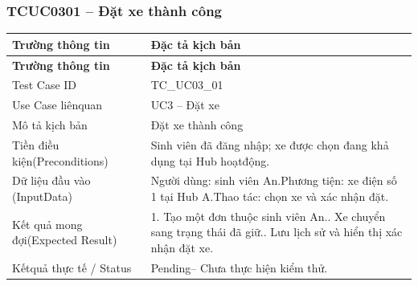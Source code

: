 \subsubsection{TCUC0301 – Đặt xe thành công}
\begin{longtable}{|L{0.24\textwidth}|L{0.70\textwidth}|}
\hline
\textbf{Trường thông tin} & \textbf{Đặc tả kịch bản} \\
\hline
\endfirsthead
\hline
\textbf{Trường thông tin} & \textbf{Đặc tả kịch bản} \\
\hline
\endhead
Test Case ID & TC\_UC03\_01 \\
\hline
Use Case liênquan & UC3 – Đặt xe \\
\hline
Mô tả kịch bản & Đặt xe thành công \\
\hline
Tiền điều kiện\newline (Preconditions) & Sinh viên đã đăng nhập; xe được chọn đang khả dụng tại Hub hoạt\newline động. \\
\hline
Dữ liệu đầu vào (Input\newline Data) & Người dùng: sinh viên An.\newline Phương tiện: xe điện số 1 tại Hub A.\newline Thao tác: chọn xe và xác nhận đặt. \\
\hline
Kết quả mong đợi\newline (Expected Result) & 1. Tạo một đơn thuộc sinh viên An.. Xe chuyển sang trạng thái đã giữ.. Lưu lịch sử và hiển thị xác nhận đặt xe. \\
\hline
Kếtquả thực tế / Status & Pending– Chưa thực hiện kiểm thử. \\
\hline
\end{longtable}
\vspace{-0.5\baselineskip}
